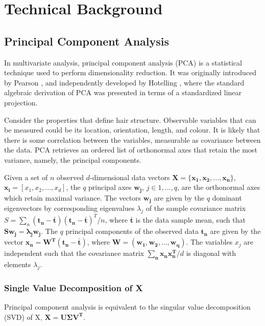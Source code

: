 \documentclass[ %
                    author={Dillon Keith Diep},
                supervisor={Dr. Carl Henrik Ek},
                    degree={MEng},
                     title={Assisted Content Generation for 3D Hair Geometry},
                  subtitle={[INCOMPLETE DRAFT, NOT FOR SUBMISSION]},
                      type={Research},
                      year={2014} ]{dissertation}
\begin{document}

\chapter{Technical Background}
\label{chap:technical}

\section{Principal Component Analysis}
In multivariate analysis, principal component analysis (PCA) is a statistical technique used to perform dimensionality reduction. \cite{pca2002} It was originally introduced by Pearson \cite{pca1901}, and independently developed by Hotelling \cite{pca1933}, where the standard algebraic derivation of PCA was presented in terms of a standardized linear projection.

Consider the properties that define hair structure. Observable variables that can be measured could be its location, orientation, length, and colour. It is likely that there is some correlation between the variables, measurable as covariance between the data. PCA retrieves an ordered list of orthonormal axes that retain the most variance, namely, the principal components.

{ \color{red}
Given a set of $n$ observed $d$-dimensional data vectors $\mathbf{X=\{x_1,x_2,...,x_n\}}$, $\mathbf{x_i} = [x_1,x_2,...,x_d]$, the $q$ principal axes $\mathbf{w_j}$, $j \in {1,...,q}$, are the orthonormal axes which retain maximal variance. The vectors $\mathbf{w_j}$ are given by the $q$ dominant eigenvectors by corresponding eigenvalues $\lambda_j$ of the sample covariance matrix $S=\sum_n\mathbf{(t_n-\bar{t})(t_n-\bar{t})}^T/n$, where $\mathbf{\bar{t}}$ is the data sample mean, such that $\mathbf{Sw_j=\lambda_jw_j}$. The $q$ principal components of the observed data $\mathbf{t_n}$ are given by the vector $\mathbf{x_n=W^T(t_n-\bar{t})}$, where $\mathbf{W=(w_1,w_2,...,w_q)}$. The variables $x_j$ are independent such that the covariance matrix $\mathbf{\sum_nx_nx^T_n}/d$ is diagonal with elements $\lambda_j$.
}

\subsection{Single Value Decomposition of X}
{ \color{red}
Principal component analysis is equivalent to the singular value decomposition (SVD) of X, $\mathbf{X=U\Sigma V^T}$.
}
\end{document}
